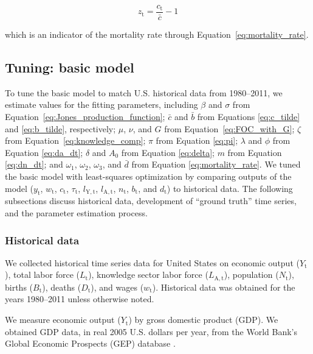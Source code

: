 \documentclass[letterpaper,12pt]{article}
\begin{document}
\begin{equation} \label{eq:z}
	z_\mathrm{t} = \frac{c_\mathrm{t}}{\bar c} - 1
\end{equation}

\noindent which is an indicator of the mortality rate through Equation~\ref{eq:mortality_rate}.

\subsection{Tuning: basic model}
\label{sec:basic_model_tuning}

To tune the basic model to match U.S. historical data from 1980--2011, we estimate values for the fitting parameters, including $\beta$ and $\sigma$ from Equation~\ref{eq:Jones_production_function}; $\bar c$ and $\bar b$ from Equations \ref{eq:c_tilde} and \ref{eq:b_tilde}, respectively; $\mu$, $\nu$, and $G$ from Equation~\ref{eq:FOC_with_G}; $\zeta$ from Equation~\ref{eq:knowledge_comp}; $\pi$ from Equation \ref{eq:pi}; $\lambda$ and $\phi$ from Equation \ref{eq:da_dt}; $\delta$ and $A_\mathrm{0}$ from Equation \ref{eq:delta}; $m$ from Equation \ref{eq:dn_dt}; and $\omega_1$, $\omega_2$, $\omega_3$, and $\bar d$ from Equation \ref{eq:mortality_rate}. We tuned the basic model with least-squares optimization by comparing outputs of the model ($y_\mathrm{t}$, $w_\mathrm{t}$, $c_\mathrm{t}$, $\tau_\mathrm{t}$, $l_\mathrm{Y,t}$, $l_\mathrm{A,t}$, $n_\mathrm{t}$, $b_{\mathrm{t}}$, and $d_\mathrm{t}$) to historical data. The following subsections discuss historical data, development of ``ground truth'' time series, and the parameter estimation process.

\subsubsection{Historical data}
\label{sec:basic_model_historical_data}

We collected historical time series data for United States on economic output ($Y_\mathrm{t}$), total labor force ($L_\mathrm{t}$), knowledge sector labor force ($L_\mathrm{A,t}$), population ($N_\mathrm{t}$), births ($B_\mathrm{t}$), deaths ($D_\mathrm{t}$), and wages ($w_\mathrm{t}$). Historical data was obtained for the years 1980--2011 unless otherwise noted. 

We measure economic output ($Y_\mathrm{t}$) by gross domestic product (GDP). We obtained GDP data, in real 2005 U.S. dollars per year, from the World Bank's Global Economic Prospects (GEP) database \citep{WorldBankGEP:2013a}.
\end{document}
